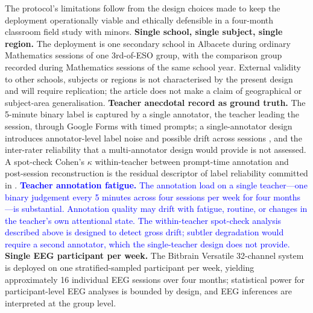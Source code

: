 The protocol's limitations follow from the design choices made to keep the deployment operationally viable and ethically defensible in a four-month classroom field study with minors. \textbf{Single school, single subject, single region.} The deployment is one secondary school in Albacete during ordinary Mathematics sessions of one 3rd-of-ESO group, with the comparison group recorded during Mathematics sessions of the same school year. External validity to other schools, subjects or regions is not characterised by the present design and will require replication; the article does not make a claim of geographical or subject-area generalisation. \textbf{Teacher anecdotal record as ground truth.} The 5-minute binary label is captured by a single annotator, the teacher leading the session, through Google Forms with timed prompts; a single-annotator design introduces annotator-level label noise and possible drift across sessions \parencite{Frenay2014_label_noise,Bosch2022_engagement_observers}, and the inter-rater reliability that a multi-annotator design would provide is not assessed. A spot-check Cohen's $\kappa$ within-teacher between prompt-time annotation and post-session reconstruction is the residual descriptor of label reliability committed in . \textcolor{blue}{\textbf{Teacher annotation fatigue.} The annotation load on a single teacher---one binary judgement every 5 minutes across four sessions per week for four months---is substantial. Annotation quality may drift with fatigue, routine, or changes in the teacher's own attentional state. The within-teacher spot-check analysis described above is designed to detect gross drift; subtler degradation would require a second annotator, which the single-teacher design does not provide.} \textbf{Single EEG participant per week.} The Bitbrain Versatile 32-channel system is deployed on one stratified-sampled participant per week, yielding approximately 16 individual EEG sessions over four months; statistical power for participant-level EEG analyses is bounded by design, and EEG inferences are interpreted at the group level.

